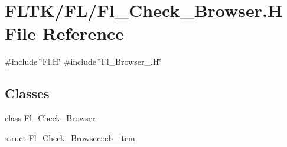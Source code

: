 \hypertarget{_fl___check___browser_8_h}{}\section{F\+L\+T\+K/\+F\+L/\+Fl\+\_\+\+Check\+\_\+\+Browser.H File Reference}
\label{_fl___check___browser_8_h}
{\ttfamily \#include \char`\"{}Fl.\+H\char`\"{}}\newline
{\ttfamily \#include \char`\"{}Fl\+\_\+\+Browser\+\_\+.\+H\char`\"{}}\newline
\subsection*{Classes}
\begin{DoxyCompactItemize}
\item 
class \hyperlink{class_fl___check___browser}{Fl\+\_\+\+Check\+\_\+\+Browser}
\item 
struct \hyperlink{struct_fl___check___browser_1_1cb__item}{Fl\+\_\+\+Check\+\_\+\+Browser\+::cb\+\_\+item}
\end{DoxyCompactItemize}
